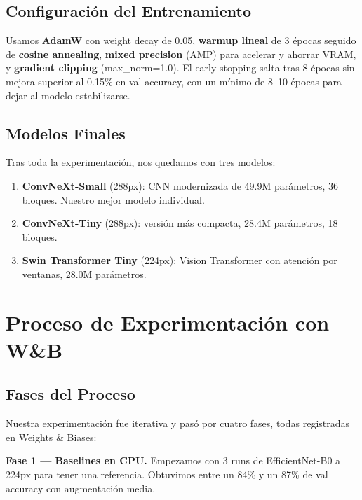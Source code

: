 \documentclass[11pt,a4paper]{article}
\begin{document}
\subsection{Configuración del Entrenamiento}

Usamos \textbf{AdamW} con weight decay de 0.05, \textbf{warmup lineal} de 3 épocas seguido de \textbf{cosine annealing}, \textbf{mixed precision} (AMP) para acelerar y ahorrar VRAM, y \textbf{gradient clipping} (max\_norm=1.0). El early stopping salta tras 8 épocas sin mejora superior al 0.15\% en val accuracy, con un mínimo de 8--10 épocas para dejar al modelo estabilizarse.

\subsection{Modelos Finales}

Tras toda la experimentación, nos quedamos con tres modelos:

\begin{enumerate}
    \item \textbf{ConvNeXt-Small} (288px): CNN modernizada de 49.9M parámetros, 36 bloques. Nuestro mejor modelo individual.
    \item \textbf{ConvNeXt-Tiny} (288px): versión más compacta, 28.4M parámetros, 18 bloques.
    \item \textbf{Swin Transformer Tiny} (224px): Vision Transformer con atención por ventanas, 28.0M parámetros.
\end{enumerate}


\section{Proceso de Experimentación con W\&B}

\subsection{Fases del Proceso}

Nuestra experimentación fue iterativa y pasó por cuatro fases, todas registradas en Weights \& Biases:

\textbf{Fase 1 --- Baselines en CPU.} Empezamos con 3 runs de EfficientNet-B0 a 224px para tener una referencia. Obtuvimos entre un 84\% y un 87\% de val accuracy con augmentación media.
\end{document}

